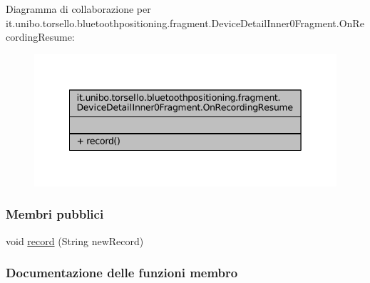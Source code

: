 Diagramma di collaborazione per it.\+unibo.\+torsello.\+bluetoothpositioning.\+fragment.\+Device\+Detail\+Inner0\+Fragment.\+On\+Recording\+Resume\+:
\nopagebreak
\begin{figure}[H]
\begin{center}
\leavevmode
\includegraphics[width=342pt]{interfaceit_1_1unibo_1_1torsello_1_1bluetoothpositioning_1_1fragment_1_1DeviceDetailInner0Fragmec6511fc8aea77ecfd2776fc4eae14545}
\end{center}
\end{figure}
\subsubsection*{Membri pubblici}
\begin{DoxyCompactItemize}
\item 
void \hyperlink{interfaceit_1_1unibo_1_1torsello_1_1bluetoothpositioning_1_1fragment_1_1DeviceDetailInner0Fragment_1_1OnRecordingResume_a68528e5fbaa02cb01776eba68da833d8_a68528e5fbaa02cb01776eba68da833d8}{record} (String new\+Record)
\end{DoxyCompactItemize}


\subsubsection{Documentazione delle funzioni membro}
\hypertarget{interfaceit_1_1unibo_1_1torsello_1_1bluetoothpositioning_1_1fragment_1_1DeviceDetailInner0Fragment_1_1OnRecordingResume_a68528e5fbaa02cb01776eba68da833d8_a68528e5fbaa02cb01776eba68da833d8}{}\label{interfaceit_1_1unibo_1_1torsello_1_1bluetoothpositioning_1_1fragment_1_1DeviceDetailInner0Fragment_1_1OnRecordingResume_a68528e5fbaa02cb01776eba68da833d8_a68528e5fbaa02cb01776eba68da833d8} 
